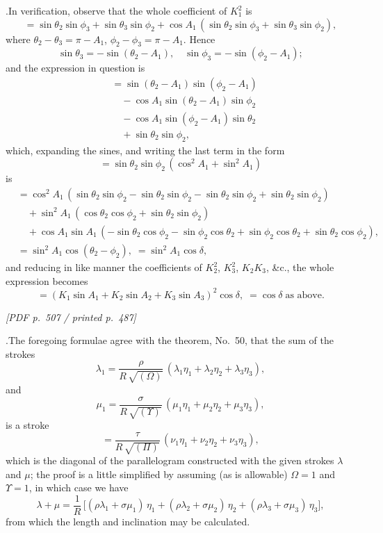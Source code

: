 \documentclass[11pt]{article}
\begin{document}
.\quad In verification, observe that the whole coefficient of $K_{1}^{2}$ is
\[
= \sin\theta_{2}\sin\phi_{3} + \sin\theta_{3}\sin\phi_{2} + \cos A_{1}\,(\sin\theta_{2}\sin\phi_{3} + \sin\theta_{3}\sin\phi_{2}),
\]
where $\theta_{2} - \theta_{3} = \pi - A_{1}$, $\phi_{2} - \phi_{3} = \pi - A_{1}$. Hence
\[
\sin\theta_{3} = -\sin(\theta_{2} - A_{1}),\quad \sin\phi_{3} = -\sin(\phi_{2} - A_{1});
\]
and the expression in question is
\begin{align*}
&= \sin(\theta_{2} - A_{1})\sin(\phi_{2} - A_{1}) \\
&\quad - \cos A_{1}\sin(\theta_{2} - A_{1})\sin\phi_{2} \\
&\quad - \cos A_{1}\sin(\phi_{2} - A_{1})\sin\theta_{2} \\
&\quad + \sin\theta_{2}\sin\phi_{2},
\end{align*}
which, expanding the sines, and writing the last term in the form
\[
= \sin\theta_{2}\sin\phi_{2}\,(\cos^{2}A_{1} + \sin^{2}A_{1})
\]
is
\begin{align*}
&= \cos^{2}A_{1}\,(\sin\theta_{2}\sin\phi_{2} - \sin\theta_{2}\sin\phi_{2} - \sin\theta_{2}\sin\phi_{2} + \sin\theta_{2}\sin\phi_{2}) \\
&\quad + \sin^{2}A_{1}\,(\cos\theta_{2}\cos\phi_{2} + \sin\theta_{2}\sin\phi_{2}) \\
&\quad + \cos A_{1}\sin A_{1}\,(-\sin\theta_{2}\cos\phi_{2} - \sin\phi_{2}\cos\theta_{2} + \sin\phi_{2}\cos\theta_{2} + \sin\theta_{2}\cos\phi_{2}), \\
&= \sin^{2}A_{1}\cos(\theta_{2} - \phi_{2}),\;= \sin^{2}A_{1}\cos\delta,
\end{align*}
and reducing in like manner the coefficients of $K_{2}^{2}$, $K_{3}^{2}$, $K_{2}K_{3}$, \&c., the whole expression becomes
\[
= (K_{1}\sin A_{1} + K_{2}\sin A_{2} + K_{3}\sin A_{3})^{2}\cos\delta,\;= \cos\delta\;\text{as above}.
\]

\vfill
\noindent\textit{[PDF p.~507 / printed p.~487]}
\newpage

.\quad The foregoing formulae agree with the theorem, No.~50, that the sum of the strokes
\[
\lambda_{1} = \frac{\rho}{R\,\sqrt{(\Omega)}}\,(\lambda_{1}\eta_{1} + \lambda_{2}\eta_{2} + \lambda_{3}\eta_{3}),
\]
and
\[
\mu_{1} = \frac{\sigma}{R\,\sqrt{(\Upsilon)}}\,(\mu_{1}\eta_{1} + \mu_{2}\eta_{2} + \mu_{3}\eta_{3}),
\]
is a stroke
\[
= \frac{\tau}{R\,\sqrt{(\Pi)}}\,(\nu_{1}\eta_{1} + \nu_{2}\eta_{2} + \nu_{3}\eta_{3}),
\]
which is the diagonal of the parallelogram constructed with the given strokes $\lambda$ and $\mu$; the proof is a little simplified by assuming (as is allowable) $\Omega = 1$ and $\Upsilon = 1$, in which case we have
\[
\lambda + \mu = \frac{1}{R}\,\bigl[(\rho\lambda_{1} + \sigma\mu_{1})\,\eta_{1} + (\rho\lambda_{2} + \sigma\mu_{2})\,\eta_{2} + (\rho\lambda_{3} + \sigma\mu_{3})\,\eta_{3}\bigr],
\]
from which the length and inclination may be calculated.
\end{document}
